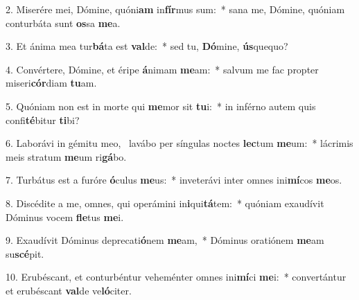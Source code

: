 2. Miserére mei, Dómine, quóni\textbf{am} in\textbf{fír}mus sum:~*  sana me, Dómine, quóniam conturbáta sunt \textbf{os}sa \textbf{me}a.\

3. Et ánima mea tur\textbf{bá}ta est \textbf{val}de:~*  sed tu, \textbf{Dó}mine, \textbf{ús}quequo?\

4. Convértere, Dómine, et éripe \textbf{á}nimam \textbf{me}am:~*  salvum me fac propter miseri\textbf{cór}diam \textbf{tu}am.\

5. Quóniam non est in morte qui \textbf{me}mor sit \textbf{tu}i:~*  in inférno autem quis confi\textbf{té}bitur \textbf{ti}bi?\

6. Laborávi in gémitu meo, \dag\  lavábo per síngulas noctes \textbf{lec}tum \textbf{me}um:~*  lácrimis meis stratum \textbf{me}um ri\textbf{gá}bo.\

7. Turbátus est a furóre \textbf{ó}culus \textbf{me}us:~*  inveterávi inter omnes ini\textbf{mí}cos \textbf{me}os.\

8. Discédite a me, omnes, qui operámini in\textbf{i}qui\textbf{tá}tem:~*  quóniam exaudívit Dóminus vocem \textbf{fle}tus \textbf{me}i.\

9. Exaudívit Dóminus deprecati\textbf{ó}nem \textbf{me}am,~*  Dóminus oratiónem \textbf{me}am su\textbf{scé}pit.\

10. Erubéscant, et conturbéntur veheménter omnes ini\textbf{mí}ci \textbf{me}i:~*  convertántur et erubéscant \textbf{val}de ve\textbf{ló}citer.\

